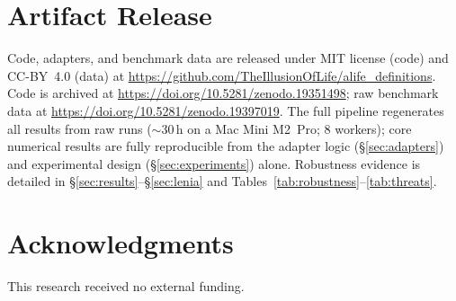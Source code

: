 \documentclass[letterpaper]{article}
\begin{document}
\section{Artifact Release}
\label{sec:artifact}

Code, adapters, and benchmark data are released under
MIT license (code) and CC-BY~4.0 (data) at
\url{https://github.com/TheIllusionOfLife/alife_definitions}.
Code is archived at \url{https://doi.org/10.5281/zenodo.19351498};
raw benchmark data at \url{https://doi.org/10.5281/zenodo.19397019}.
The full pipeline regenerates all results from raw runs (${\sim}$30\,h
on a Mac Mini M2~Pro; 8 workers); core numerical results are fully
reproducible from the adapter logic (\S\ref{sec:adapters}) and
experimental design (\S\ref{sec:experiments}) alone.
Robustness evidence is detailed in \S\ref{sec:results}--\S\ref{sec:lenia}
and Tables~\ref{tab:robustness}--\ref{tab:threats}.

\section*{Acknowledgments}
This research received no external funding.

\footnotesize


\end{document}
